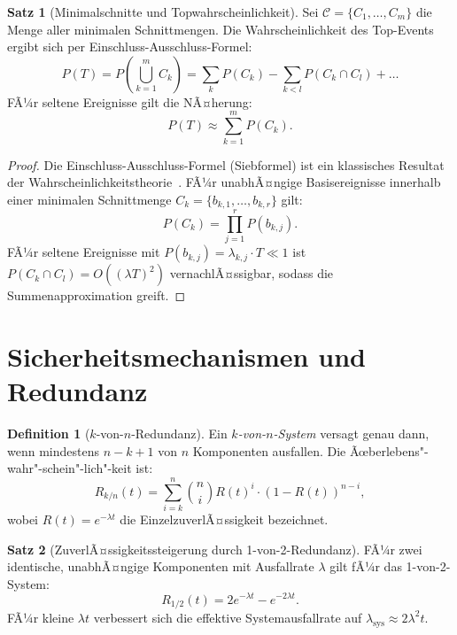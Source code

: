 ﻿\documentclass[a4paper,12pt]{article}
\theoremstyle{definition}
\newtheorem{definition}{Definition}
\newtheorem{satz}{Satz}
\begin{document}
\begin{satz}[Minimalschnitte und Topwahrscheinlichkeit]
\label{satz:fta}
  Sei $\mathcal{C} = \{C_1, \ldots, C_m\}$ die Menge aller minimalen
  Schnittmengen. Die Wahrscheinlichkeit des Top-Events ergibt sich
  per Einschluss-Ausschluss-Formel:
  \[
    P(T) = P\!\left(\bigcup_{k=1}^{m} C_k\right)
         = \sum_{k} P(C_k) - \sum_{k<l} P(C_k \cap C_l) + \ldots
  \]
  FÃ¼r seltene Ereignisse gilt die NÃ¤herung:
  \[
    P(T) \approx \sum_{k=1}^{m} P(C_k).
  \]
\end{satz}

\begin{proof}
  Die Einschluss-Ausschluss-Formel (Siebformel) ist ein klassisches
  Resultat der Wahrscheinlichkeitstheorie~\cite{feller_1968}.
  FÃ¼r unabhÃ¤ngige Basisereignisse innerhalb einer minimalen
  Schnittmenge $C_k = \{b_{k,1}, \ldots, b_{k,r}\}$ gilt:
  \[
    P(C_k) = \prod_{j=1}^{r} P(b_{k,j}).
  \]
  FÃ¼r seltene Ereignisse mit $P(b_{k,j}) = \lambda_{k,j} \cdot T \ll 1$
  ist $P(C_k \cap C_l) = O((\lambda T)^2)$ vernachlÃ¤ssigbar,
  sodass die Summenapproximation greift.
\end{proof}

\section{Sicherheitsmechanismen und Redundanz}

\begin{definition}[$k$-von-$n$-Redundanz]
  Ein \emph{$k$-von-$n$-System} versagt genau dann, wenn mindestens
  $n - k + 1$ von $n$ Komponenten ausfallen. Die Ãœberlebens"-wahr"-schein"-lich"-keit
  ist:
  \[
    R_{k/n}(t)
    = \sum_{i=k}^{n} \binom{n}{i} R(t)^i \cdot (1-R(t))^{n-i},
  \]
  wobei $R(t) = e^{-\lambda t}$ die EinzelzuverlÃ¤ssigkeit bezeichnet.
\end{definition}

\begin{satz}[ZuverlÃ¤ssigkeitssteigerung durch 1-von-2-Redundanz]
\label{satz:redundanz}
  FÃ¼r zwei identische, unabhÃ¤ngige Komponenten mit Ausfallrate
  $\lambda$ gilt fÃ¼r das 1-von-2-System:
  \[
    R_{1/2}(t) = 2e^{-\lambda t} - e^{-2\lambda t}.
  \]
  FÃ¼r kleine $\lambda t$ verbessert sich die effektive
  Systemausfallrate auf $\lambda_{\mathrm{sys}} \approx 2\lambda^2 t$.
\end{satz}
\end{document}
